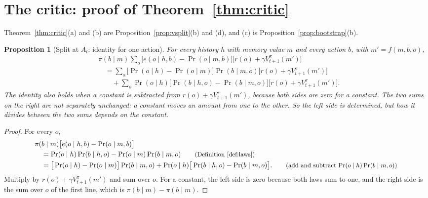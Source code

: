 \documentclass{article}
\newtheorem{proposition}{Proposition}[section]
\theoremstyle{definition}
\newcommand{\why}[1]{\tag*{\small(#1)}}
\begin{document}
\section{The critic: proof of Theorem~\ref{thm:critic}}\label{sec:evalproof}

Theorem~\ref{thm:critic}(a) and (b) are Proposition~\ref{prop:vsplit}(b) and (d), and (c) is Proposition~\ref{prop:bootstrap}(b).

\begin{proposition}[Split at $A_t$: identity for one action]\label{prop:id1}
For every history $h$ with memory value $m$ and every action $b$, with $m'=f(m,b,o)$,
\begin{align*}
&\pi(b\mid m)\sum_o\big[e(o\mid h,b)-\Pr(o\mid m,b)\big]\big[r(o)+\gamma V^\pi_{t+1}(m')\big]\\
&\quad=\sum_o\big[\Pr(o\mid h)-\Pr(o\mid m)\big]\Pr(b\mid m,o)\big[r(o)+\gamma V^\pi_{t+1}(m')\big]\\
&\qquad+\sum_o\Pr(o\mid h)\big[\Pr(b\mid h,o)-\Pr(b\mid m,o)\big]\big[r(o)+\gamma V^\pi_{t+1}(m')\big].
\end{align*}
The identity also holds when a constant is subtracted from $r(o)+\gamma V^\pi_{t+1}(m')$, because both sides are zero for a constant. The two sums on the right are not separately unchanged: a constant moves an amount from one to the other. So the left side is determined, but how it divides between the two sums depends on the constant.
\end{proposition}

\begin{proof}
For every $o$,
\begin{align*}
&\pi(b\mid m)\big[e(o\mid h,b)-\Pr(o\mid m,b)\big]\\
&\quad=\Pr(o\mid h)\Pr(b\mid h,o)-\Pr(o\mid m)\Pr(b\mid m,o) \why{Definition~\ref{def:laws}}\\
&\quad=\big[\Pr(o\mid h)-\Pr(o\mid m)\big]\Pr(b\mid m,o)+\Pr(o\mid h)\big[\Pr(b\mid h,o)-\Pr(b\mid m,o)\big]. \why{add and subtract $\Pr(o\mid h)\Pr(b\mid m,o)$}
\end{align*}
Multiply by $r(o)+\gamma V^\pi_{t+1}(m')$ and sum over $o$. For a constant, the left side is zero because both laws sum to one, and the right side is the sum over $o$ of the first line, which is $\pi(b\mid m)-\pi(b\mid m)$.
\end{proof}
\end{document}
